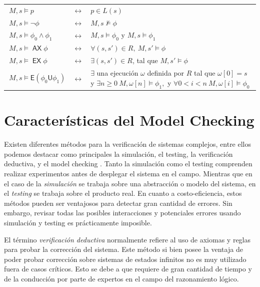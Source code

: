 \documentclass[pdftex,a4paper,12pt]{book}
\newcommand{\U}{\mathbin{\textsf{U}}}
\newcommand{\E}{\mathbin{\textsf{E}}}
\newcommand{\AX}{\mathop{\mathsf{AX}}}
\newcommand{\EX}{\mathop{\mathsf{EX}}}
\begin{document}
\begin{tabularx}{\textwidth}{@{\textbullet}lcX}
$~M,s \models p$ & $\leftrightarrow$ & $p \in L(s)$\\
$~M,s \models \neg\phi $ & $\leftrightarrow$ & $M,s \not\models \phi$\\
$~M,s \models \phi_0 \wedge \phi_1 $ & $\leftrightarrow$ & $ M,s \models \phi_0 \text{ y } M,s \models \phi_1$\\
$~M,s \models \AX\phi $ & $\leftrightarrow$ & $ \forall (s,s') \in R,~ M,s' \models \phi$\\
$~M,s \models \EX\phi $ & $\leftrightarrow$ & $ \exists (s,s') \in R$, tal que $M,s' \models \phi$\\
$~M,s \models \E(\phi_0 \U \phi_1) $ & $\leftrightarrow$ & $\exists$ una ejecuci\'on $\omega$ definida por $R$ tal que $\omega[0] = s$ y $\exists n \geq 0 ~M,\omega[n] \models \phi_1,$ y $\forall 0<i<n~ M, \omega[i] \models \phi_0$\\
\end{tabularx}








\section{Caracter\'isticas del Model Checking}

Existen diferentes m\'etodos para la verificaci\'on de sistemas complejos, entre ellos podemos destacar como principales la simulaci\'on, el testing, la verificaci\'on deductiva, y el model checking \cite{Clarke}. Tanto la simulaci\'on como el testing comprenden realizar experimentos antes de desplegar el sistema en el campo. Mientras que en el caso de la \textit{simulaci\'on} se trabaja sobre una abstracci\'on o modelo del sistema, en el \textit{testing} se trabaja sobre el producto real. En cuanto a costo-eficiencia, estos m\'etodos pueden ser ventajosos para detectar gran cantidad de errores. Sin embargo, revisar todas las posibles interacciones y potenciales errores usando simulaci\'on y testing es pr\'acticamente imposible.

El t\'ermino \textit{verificaci\'on deductiva} normalmente refiere al uso de axiomas y reglas para probar la correcci\'on del sistema. Este m\'etodo si bien posee la ventaja de poder probar correcci\'on sobre sistemas de estados infinitos no es muy utilizado fuera de casos cr\'iticos. Esto se debe a que requiere de gran cantidad de tiempo y de la conducci\'on por parte de expertos en el campo del razonamiento l\'ogico.
\end{document}
